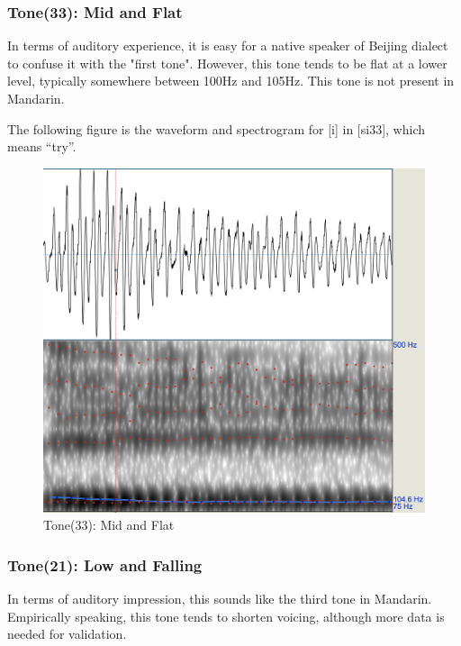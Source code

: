 \documentclass[a4paper]{article}
\begin{document}
\subsubsection{Tone(33): Mid and Flat}
In terms of auditory experience, it is easy for a native speaker of Beijing dialect to confuse it with the "first tone". However, this tone tends to be flat at a lower level, typically somewhere between 100Hz and 105Hz. This tone is not present in Mandarin. 

The following figure is the waveform and spectrogram for [i] in [si33], which means ``try''. 
\begin{figure}[H]
    \centering
    \includegraphics[scale=0.4]{imgs/tone33.png}
    \caption{Tone(33): Mid and Flat}
\end{figure}

\subsubsection{Tone(21): Low and Falling}
In terms of auditory impression, this sounds like the third tone in Mandarin. Empirically speaking, this tone tends to shorten voicing, although more data is needed for validation. 
\end{document}

